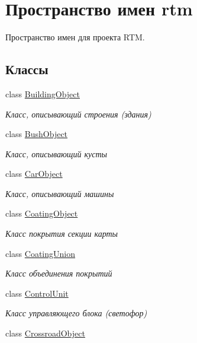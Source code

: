 \hypertarget{namespacertm}{}\section{Пространство имен rtm}
\label{namespacertm}


Пространство имен для проекта R\+TM.  


\subsection*{Классы}
\begin{DoxyCompactItemize}
\item 
class \hyperlink{classrtm_1_1_building_object}{Building\+Object}
\begin{DoxyCompactList}\small\item\em Класс, описывающий строения (здания) \end{DoxyCompactList}\item 
class \hyperlink{classrtm_1_1_bush_object}{Bush\+Object}
\begin{DoxyCompactList}\small\item\em Класс, описывающий кусты \end{DoxyCompactList}\item 
class \hyperlink{classrtm_1_1_car_object}{Car\+Object}
\begin{DoxyCompactList}\small\item\em Класс, описывающий машины \end{DoxyCompactList}\item 
class \hyperlink{classrtm_1_1_coating_object}{Coating\+Object}
\begin{DoxyCompactList}\small\item\em Класс покрытия секции карты \end{DoxyCompactList}\item 
class \hyperlink{classrtm_1_1_coating_union}{Coating\+Union}
\begin{DoxyCompactList}\small\item\em Класс объединения покрытий \end{DoxyCompactList}\item 
class \hyperlink{classrtm_1_1_control_unit}{Control\+Unit}
\begin{DoxyCompactList}\small\item\em Класс управляющего блока (светофор) \end{DoxyCompactList}\item 
class \hyperlink{classrtm_1_1_crossroad_object}{Crossroad\+Object}

\end{DoxyCompactItemize}

